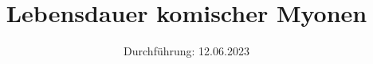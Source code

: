 

\subject{V01}
\title{Lebensdauer komischer Myonen}
\date{%
  Durchführung: 12.06.2023
}



\maketitle
\thispagestyle{empty}
\newpage






\printbibliography{}

\appendix
\newpage



